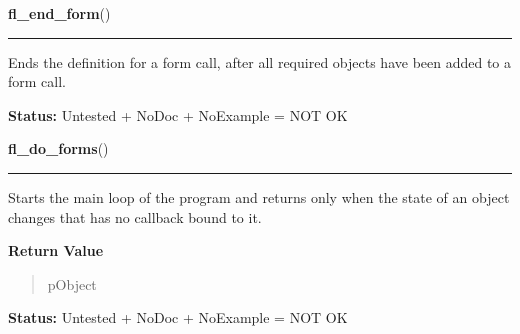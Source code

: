     \vspace{0.5ex}

\hspace{.8\funcindent}\begin{boxedminipage}{\funcwidth}

    \raggedright \textbf{fl\_end\_form}()

    \vspace{-1.5ex}

    \rule{\textwidth}{0.5\fboxrule}
\setlength{\parskip}{2ex}
    Ends the definition for a form call, after all required objects have 
    been added to a form call.

\setlength{\parskip}{1ex}
\textbf{Status:} Untested + NoDoc + NoExample = NOT OK



    \end{boxedminipage}

    \label{xformslib:library:fl_do_forms}

    \vspace{0.5ex}

\hspace{.8\funcindent}\begin{boxedminipage}{\funcwidth}

    \raggedright \textbf{fl\_do\_forms}()

    \vspace{-1.5ex}

    \rule{\textwidth}{0.5\fboxrule}
\setlength{\parskip}{2ex}
    Starts the main loop of the program and returns only when the state of 
    an object changes that has no callback bound to it.

\setlength{\parskip}{1ex}
      \textbf{Return Value}
    \vspace{-1ex}

      \begin{quote}
      pObject

      \end{quote}

\textbf{Status:} Untested + NoDoc + NoExample = NOT OK



    \end{boxedminipage}

    \label{xformslib:library:fl_check_forms}

